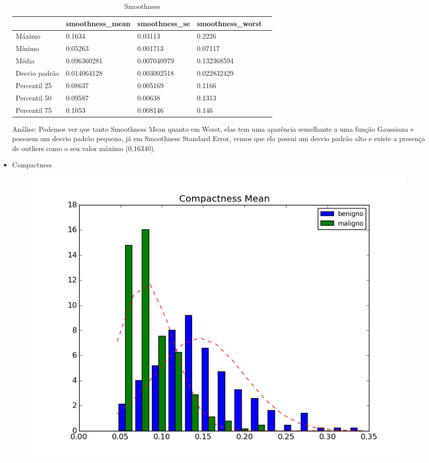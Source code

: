 \documentclass[11pt,a4paper]{article}
\numberwithin{equation}{section}
\begin{document}
\begin{itemize}
\begin{table}[H]
\centering
\caption{Smoothness}
\label{my-label}
\begin{tabular}{lllll} \hline
              & smoothness\_mean & smoothness\_se & smoothness\_worst &  \\ \hline
Máximo        & 0.1634           & 0.03113        & 0.2226            &  \\
Mínimo        & 0.05263          & 0.001713       & 0.07117           &  \\
Média         & 0.096360281      & 0.007040979    & 0.132368594       &  \\
Desvio padrão & 0.014064128      & 0.003002518    & 0.022832429       &  \\
Percentil 25  & 0.08637          & 0.005169       & 0.1166            &  \\
Percentil 50  & 0.09587          & 0.00638        & 0.1313            &  \\
Percentil 75  & 0.1053           & 0.008146       & 0.146             & \\ \hline
\end{tabular}
\end{table}

Análise: Podemos ver que tanto Smoothness Mean quanto em Worst, elas tem uma aparência semelhante a uma função Gaussiana e possuem um desvio padrão pequeno, já em Smoothness Standard Error, vemos que ela possui um desvio padrão alto e existe a presença de outliers como o seu valor máximo (0,16340).


\item Compactness
\begin{figure}[H]
\centering
  \includegraphics[width=.5\linewidth]{../img/hist/compactness_mean}
  \label{fig:test1}
\end{figure}%



\end{itemize}
\end{document}
